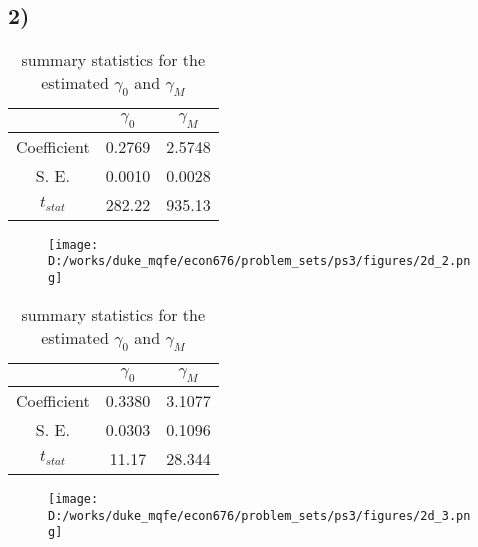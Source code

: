 \documentclass{report}
\begin{document}
\subsection{2)}


\begin{table}[ht]
\centering
\caption{summary statistics for the estimated $\gamma_0$ and $\gamma_M$}
\begin{tabular}{c | c | c}
		& $\gamma_0$	& $\gamma_M$	\\	[0.5ex] 	\hline
Coefficient	& 0.2769 		& 2.5748		\\
S. E.		& 0.0010		& 0.0028		\\
$t_{stat}$	& 282.22 		& 935.13		\\ 	[0.5ex]	\hline \hline
\end{tabular}
\end{table}

\begin{figure}[h]
	\centering
	\caption{ }
	\texttt{[image: D:/works/duke\_mqfe/econ676/problem\_sets/ps3/figures/2d\_2.png]}
\end{figure}






\begin{table}[ht]
\centering
\caption{summary statistics for the estimated $\gamma_0$ and $\gamma_M$}
\begin{tabular}{c | c | c}
		& $\gamma_0$	& $\gamma_M$	\\	[0.5ex] 	\hline
Coefficient	& 0.3380 		& 3.1077		\\
S. E.		& 0.0303		& 0.1096		\\
$t_{stat}$	& 11.17 		& 28.344		\\ 	[0.5ex]	\hline \hline
\end{tabular}
\end{table}

\begin{figure}[h]
	\centering
	\caption{ }
	\texttt{[image: D:/works/duke\_mqfe/econ676/problem\_sets/ps3/figures/2d\_3.png]}
\end{figure}
\end{document}
